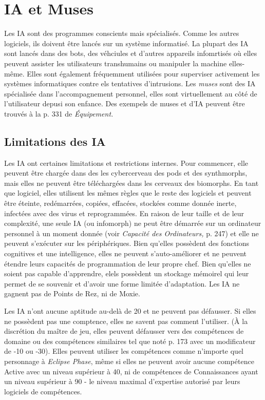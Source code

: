 \section{IA et Muses} 

Les IA sont des programmes conscients mais spécialisés. Comme les autres logiciels, ils doivent être lancés sur un système informatisé. La plupart des IA sont lancés dans des bots, des véhciules et d'autres appareils infomrtisés où elles peuvent assister les utilisateurs transhumains ou manipuler la machine elles-même. Elles sont également fréquemment utilisées pour superviser activement les systèmes informatiques contre els tentatives d'intrusions. Les \textit{muses} sont des IA spécialisée dans l'accompagnement personnel, elles sont virtuellement au côté de l'utilisateur depusi son enfance. Des exempels de muses et d'IA peuvent être trouvés à la p. 331 de \textit{Équipement.} 

\subsection{Limitations des IA} 

Les IA ont certaines limitations et restrictions internes. Pour commencer, elle peuvent être chargée dans des les cybercerveau des pods et des synthmorphs, mais elles ne peuvent être téléchargées dans les cerveaux des biomorphs. En tant que logiciel, elles utilisent les mêmes règles que le reste des logiciels et peuvent être éteinte, redémarrées, copiées, effacées, stockées comme donnée inerte, infectées avec des virus et reprogrammées. En raison de leur taille et de leur complexité, une seule IA (ou infomorph) ne peut être démarrée sur un ordinateur personnel à un moment donnée (voir \textit{Capacité des Ordinateurs,} p. 247) et elle ne peuvent s'exécuter sur les périphériques. Bien qu'elles possèdent des fonctions cognitives et une intelligence, elles ne peuvent s'auto-améliorer et ne peuvent étendre  leurs capacités de programmation de leur propre chef. Bien qu'elles ne soient pas capable d'apprendre, elels possèdent un stockage mémoirel qui leur permet de se souvenir et d'avoir une forme limitée d'adaptation. Les IA ne gagnent pas de Points de Rez, ni de Moxie. 

Les IA n'ont aucune aptitude au-delà de 20 et ne peuvent pas défausser. Si elles ne possèdent pas une comptence, elles ne savent pas comment l'utiliser. (À la discrétion du maître de jeu, elles peuvent défausser vers des compétences de domaine ou des compétences similaires tel que noté p. 173 avec un modificateur de -10 ou -30). Elles peuvent utiliser les compétences comme n'importe quel personnage à \textit{Eclipse Phase}, même si elles ne peuvent avoir aucune compétence Active avec un niveau supérieur à 40, ni de compétences de Connaissances ayant un niveau supérieur à 90 - le niveau maximal d'expertise autorisé par leurs logiciels de compétences. 

